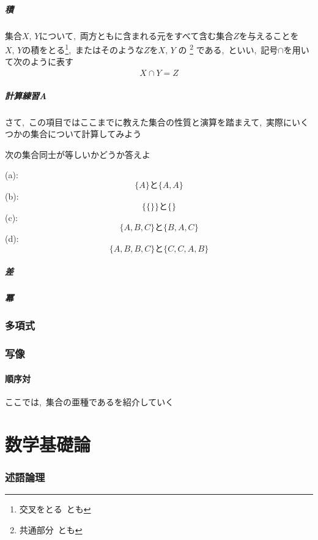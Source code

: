 \documentclass[hyperref,a4paper,12pt]{kininaruki}
\begin{document}
\subsubsection{積}
集合$X,\, Y$について,\, 両方ともに含まれる元をすべて含む集合$Z$を与えることを
$X,\, Y$の積をとる\footnote{交叉をとる\, とも},\, またはそのような$Z$を$X,\, Y$%
の
\footnote{共通部分\, とも}
である,\, といい,\, 記号$\cap$を用いて次のように表す
\begin{align}
    X \cap Y =Z
\end{align}
\newpage
\subsubsection*{計算練習A}
さて,\, この項目ではここまでに教えた集合の性質と演算を踏まえて,\, 実際にいくつかの集合について計算してみよう
\begin{practice}{ 次の集合同士が等しいかどうか答えよ}
\begin{multicols}{2}
    \noindent
    (a):$$\{A\}\text{と}\{A,A\}$$
    \noindent
    (b):$$\{\{\}\}\text{と}\{\}$$
    \noindent
    (c):$$\{A,B,C\}\text{と}\{B,A,C\}$$
    \noindent
    (d):$$\{A,B,B,C\}\text{と}\{C,C,A,B\}$$
\end{multicols}
\end{practice}
\newpage
\subsubsection{差}
\newpage
\subsubsection{冪}
\newpage
\section{多項式}
\newpage
\section{写像}
\subsection{順序対}
ここでは,\, 集合の亜種であるを紹介していく
\newpage
\part{数学基礎論}
\section{述語論理}
\newpage
\end{document}
